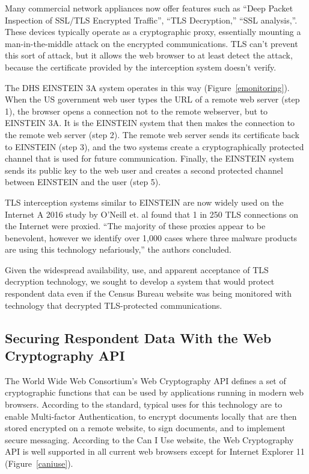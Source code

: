 \documentclass[fleqn,10pt]{wlscirep}
\begin{document}
Many commercial network appliances now offer features such as ``Deep
Packet Inspection of SSL/TLS Encrypted
Traffic''\cite{sonicwall}, ``TLS Decryption,''\cite{paloalto} ``SSL
analysis,''\cite{globalsign}. These devices typically operate as a
cryptographic proxy, essentially mounting a man-in-the-middle attack
on the encrypted communications. TLS can't prevent this sort of
attack, but it allows the web browser to at least detect the attack,
because the certificate provided by the interception system doesn't
verify.

The DHS EINSTEIN 3A system operates in this way
(Figure~\ref{emonitoring}). When the US government web user types
the URL of a remote web server (step 1), the browser opens a
connection not to the remote webserver, but to EINSTEIN 3A. It is the
EINSTEIN system that then makes the connection to the remote web
server (step 2). The remote web server sends its certificate back to
EINSTEIN (step 3), and the two systems create a cryptographically
protected channel that is used for future communication.
Finally, the EINSTEIN system sends its public key to the web user and
creates a second protected channel between EINSTEIN and the user (step
5). 

TLS interception systems similar to EINSTEIN are now widely used on the Internet
A 2016 study by O'Neill et. al found that 1 in 250 TLS
connections on the Internet were proxied. ``The majority of these proxies appear to be benevolent,
however we identify over 1,000 cases where three malware
products are using this technology nefariously,'' the authors concluded.\cite{DBLP:conf/imc/ONeillRSZ16}

Given the widespread availability, use, and apparent acceptance of TLS
decryption technology, we sought to develop a system that would
protect respondent data even if the Census Bureau website was being
monitored with technology that decrypted TLS-protected communications. 
 
\subsection{Securing Respondent Data With the Web Cryptography API}

The World Wide Web Consortium's Web Cryptography API\cite{wcapi}
defines a set of cryptographic functions that can be used by
applications running in modern web browsers. According to the
standard, typical uses for this technology are to enable Multi-factor
Authentication, to encrypt documents locally that are then stored
encrypted on a remote website, to sign documents, and to implement
secure messaging. According to the Can I Use website, the Web
Cryptography API is well supported in all current web browsers except
for Internet Explorer 11 (Figure~\ref{caniuse}).
\end{document}
